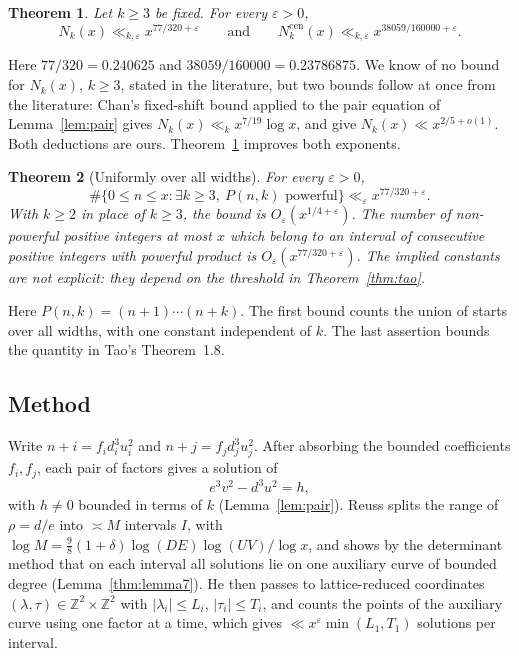 \documentclass[11pt,reqno]{amsart}
\newtheorem{theorem}{Theorem}[section]
\theoremstyle{definition}
\theoremstyle{remark}
\numberwithin{equation}{section}
\newcommand{\Z}{\mathbb Z}
\newcommand{\Ncen}{N_k^{\mathrm{cen}}}
\begin{document}
\begin{theorem}\label{thm:k3}
Let $k\ge3$ be fixed. For every $\varepsilon>0$,
\[
N_k(x)\ll_{k,\varepsilon}x^{77/320+\varepsilon}
\qquad\text{and}\qquad
\Ncen(x)\ll_{k,\varepsilon}x^{38059/160000+\varepsilon}.
\]
\end{theorem}

Here $77/320=0.240625$ and $38059/160000=0.23786875$. We know of no bound for
$N_k(x)$, $k\ge3$, stated in the literature, but two bounds follow at once from
the literature: Chan's fixed-shift bound \cite[Theorem~4]{Chan2012} applied
to the pair equation of Lemma~\ref{lem:pair} gives $N_k(x)\ll_kx^{7/19}\log x$,
and \cite[Theorem~1.8 and (1.16)]{Tao} give $N_k(x)\ll x^{2/5+o(1)}$. Both
deductions are ours. Theorem~\ref{thm:k3} improves both exponents.

\begin{theorem}[Uniformly over all widths]\label{thm:uniform}
For every $\varepsilon>0$,
\[
 \#\{0\le n\le x:\exists k\ge3,\ P(n,k)\text{ powerful}\}
 \ll_\varepsilon x^{77/320+\varepsilon}.
\]
With $k\ge2$ in place of $k\ge3$, the bound is
$O_\varepsilon(x^{1/4+\varepsilon})$.
The number of non-powerful positive integers at most $x$ which belong to
an interval of consecutive positive integers with powerful product is
$O_\varepsilon(x^{77/320+\varepsilon})$.
The implied constants are not explicit: they depend on the threshold in
Theorem~\ref{thm:tao}.
\end{theorem}

Here $P(n,k)=(n+1)\cdots(n+k)$. The first bound counts the union of starts
over all widths, with one constant independent of $k$. The last assertion
bounds the quantity in Tao's Theorem~1.8.

\subsection{Method}
Write $n+i=f_id_i^3u_i^2$ and $n+j=f_jd_j^3u_j^2$. After absorbing the bounded
coefficients $f_i,f_j$, each pair of factors gives a solution of
\begin{equation}\label{eq:pair}
e^3v^2-d^3u^2=h,
\end{equation}
with $h\ne0$ bounded in terms of $k$ (Lemma~\ref{lem:pair}). Reuss
\cite[\S2]{Reuss} splits the range of $\rho=d/e$ into $\asymp M$ intervals
$I$, with $\log M=\tfrac98(1+\delta)\log(DE)\log(UV)/\log x$, and shows by the
determinant method that on each interval all solutions lie on one auxiliary
curve of bounded degree (Lemma~\ref{thm:lemma7}). He then passes to
lattice-reduced coordinates $(\lambda,\tau)\in\Z^2\times\Z^2$ with
$|\lambda_i|\le L_i$, $|\tau_i|\le T_i$, and counts the points of the
auxiliary curve using one factor at a time, which gives
$\ll x^{\varepsilon}\min(L_1,T_1)$ solutions per interval.
\end{document}
